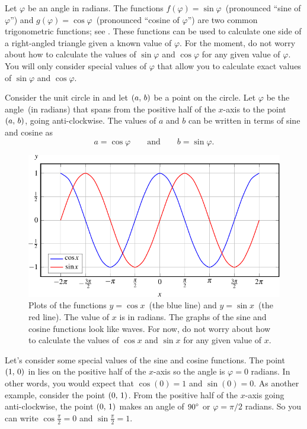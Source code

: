\documentclass[a4paper,oneside,12pt]{article}
\begin{document}
Let $\varphi$ be an angle in radians.  The functions
$f(\varphi) = \sin\varphi$~(pronounced ``sine of $\varphi$'') and
$g(\varphi) = \cos\varphi$~(pronounced ``cosine of $\varphi$'') are
two common trigonometric functions; see .
These functions can be used to calculate one side of a right-angled
triangle given a known value of $\varphi$.  For the moment, do not
worry about how to calculate the values of $\sin\varphi$ and
$\cos\varphi$ for any given value of $\varphi$.  You will only
consider special values of $\varphi$ that allow you to calculate exact
values of $\sin\varphi$ and $\cos\varphi$.

Consider the unit circle in  and let
$\left\lparen{a},\, {b}\right\rparen$ be a point on the circle.  Let $\varphi$ be the
angle~(in radians) that spans from the positive half of the $x$-axis
to the point $\left\lparen{a},\, {b}\right\rparen$, going anti-clockwise.  The values of $a$
and $b$ can be written in terms of sine and cosine as
\begin{equation}
\label{eqn:value_of_x_y_on_unit_circle}
a = \cos\varphi
\qquad\text{and}\qquad
b = \sin\varphi.
\end{equation}

\begin{figure}[!htbp]
\centering
\includegraphics[scale=1]{image/04/cos-sin.pdf}
\caption{%
  Plots of the functions $y = \cos x$~(the blue line) and
  $y = \sin x$~(the red line).  The value of $x$ is in radians.  The
  graphs of the sine and cosine functions look like waves.  For now,
  do not worry about how to calculate the values of $\cos x$ and
  $\sin x$ for any given value of $x$.
}
\label{fig:cosine_sine}
\end{figure}

Let's consider some special values of the sine and cosine functions.
The point $\left\lparen{1},\, {0}\right\rparen$ in  lies on
the positive half of the $x$-axis so the angle is $\varphi = 0$
radians.  In other words, you would expect that $\cos(0) = 1$ and
$\sin(0) = 0$.  As another example, consider the point $\left\lparen{0},\, {1}\right\rparen$.
From the positive half of the $x$-axis going anti-clockwise, the point
$\left\lparen{0},\, {1}\right\rparen$ makes an angle of ${90}^{\circ}$ or $\varphi = \pi / 2$
radians.  So you can write $\cos\frac{\pi}{2} = 0$ and
$\sin\frac{\pi}{2} = 1$.
\end{document}
